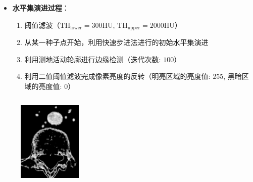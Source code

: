 \begin{frame}
\begin{itemize}
  \item \textbf{水平集演进过程}：
  \begin{enumerate}
    \item 阈值滤波（$\text{TH}_{\text{lower}} = 300\text{HU}$, $\text{TH}_{\text{upper}} = 2000\text{HU}$）
    \item 从某一种子点开始，利用快速步进法进行的初始水平集演进
    \item 利用测地活动轮廓进行边缘检测（迭代次数: $100$）
    \item 利用二值阈值滤波完成像素亮度的反转（明亮区域的亮度值: $255$, 黑暗区域的亮度值: $0$）
  \end{enumerate}
\end{itemize}
\begin{columns}[b,onlytextwidth]
\begin{column}{.25\textwidth}
\begin{figure}[t]
\centering
\includegraphics[height=1.5in]{../../Figures/gac/dcm_threshold.eps}
\end{figure}
\end{column}
\begin{column}{.25\textwidth}
\begin{figure}[t]
\centering
\setlength{\fboxrule}{0.1pt}
\setlength{\fboxsep}{0cm}
\end{figure}
\end{column}
\begin{column}{.25\textwidth}
\begin{figure}[t]
\centering
\setlength{\fboxrule}{0.1pt}
\setlength{\fboxsep}{0cm}

\end{figure}
\end{column}
\end{columns}
\end{frame}
